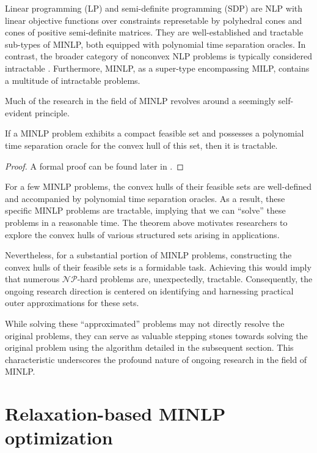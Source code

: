 Linear programming (LP) and semi-definite programming (SDP) are NLP with linear objective functions over constraints represetable by polyhedral cones and cones of positive semi-definite matrices. They are well-established and tractable sub-types of 
 MINLP, both equipped with polynomial time separation oracles. In contrast, the broader category of nonconvex NLP problems is typically considered intractable \cite{liberti2019undecidability}. Furthermore, MINLP, as a super-type encompassing MILP, contains a multitude of intractable problems.

Much of the research in the field of MINLP revolves around a seemingly self-evident principle.

\begin{theorem}
If a MINLP problem exhibits a compact feasible set and possesses a polynomial time separation oracle for the convex hull of this set, then it is  tractable.    
\end{theorem}
\begin{proof}
    A formal proof can be found later in .
\end{proof}


For a few MINLP problems, the convex hulls of their feasible sets are well-defined and accompanied by polynomial time separation oracles. As a result, these specific MINLP problems are tractable, implying that we can ``solve'' these problems in  a reasonable time. The theorem above motivates researchers to explore the convex hulls of various structured sets arising in applications. 

Nevertheless, for a substantial portion of MINLP problems, constructing the convex hulls of their feasible sets is a formidable task. Achieving this would imply that numerous $\mathcal{NP}$-hard problems are, unexpectedly, tractable. Consequently, the ongoing research direction is centered on identifying and harnessing practical outer approximations for these sets.

While solving these ``approximated'' problems may not directly resolve the original problems, they can serve as valuable stepping stones towards solving the original problem using the algorithm detailed in the subsequent section. This characteristic underscores the profound nature of ongoing research in the field of MINLP.

\section{Relaxation-based MINLP optimization}

